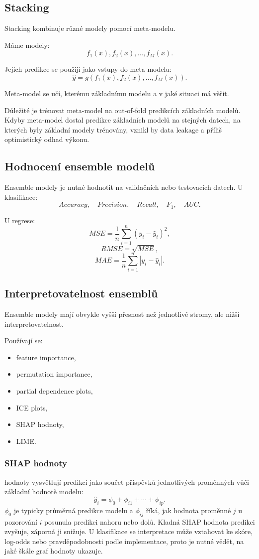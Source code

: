 \subsection{Stacking}

Stacking kombinuje různé modely pomocí meta-modelu.

Máme modely:
\[
f_1(x), f_2(x), \ldots, f_M(x).
\]

Jejich predikce se použijí jako vstupy do meta-modelu:
\[
\hat{y}
=
g(f_1(x),f_2(x),\ldots,f_M(x)).
\]

Meta-model se učí, kterému základnímu modelu a v jaké situaci má věřit.

Důležité je trénovat meta-model na out-of-fold predikcích základních modelů. Kdyby meta-model dostal
predikce základních modelů na stejných datech, na kterých byly základní modely trénovány, vznikl by data
leakage a příliš optimistický odhad výkonu.

\subsection{Hodnocení ensemble modelů}

Ensemble modely je nutné hodnotit na validačních nebo testovacích datech. U klasifikace:
\[
Accuracy,\quad Precision,\quad Recall,\quad F_1,\quad AUC.
\]

U regrese:
\[
MSE=
\frac{1}{n}
\sum_{i=1}^n
(y_i-\hat{y}_i)^2,
\]
\[
RMSE=
\sqrt{MSE},
\]
\[
MAE=
\frac{1}{n}
\sum_{i=1}^n
|y_i-\hat{y}_i|.
\]

\subsection{Interpretovatelnost ensemblů}

Ensemble modely mají obvykle vyšší přesnost než jednotlivé stromy, ale nižší interpretovatelnost.

Používají se:
\begin{itemize}
    \item feature importance,
    \item permutation importance,
    \item partial dependence plots,
    \item ICE plots,
    \item SHAP hodnoty,
    \item LIME.
\end{itemize}

\subsubsection{SHAP hodnoty}
 hodnoty vysvětlují predikci jako součet příspěvků jednotlivých proměnných vůči základní
hodnotě modelu:
\[
  \hat y_i = \phi_0 + \phi_{i1}+\cdots+\phi_{ip}.
\]
\(\phi_0\) je typicky průměrná predikce modelu a \(\phi_{ij}\) říká, jak hodnota proměnné \(j\) u
pozorování \(i\) posunula predikci nahoru nebo dolů. Kladná SHAP hodnota predikci zvyšuje, záporná ji
snižuje. U klasifikace se interpretace může vztahovat ke skóre, log-odds nebo pravděpodobnosti podle
implementace, proto je nutné vědět, na jaké škále graf hodnoty ukazuje.


